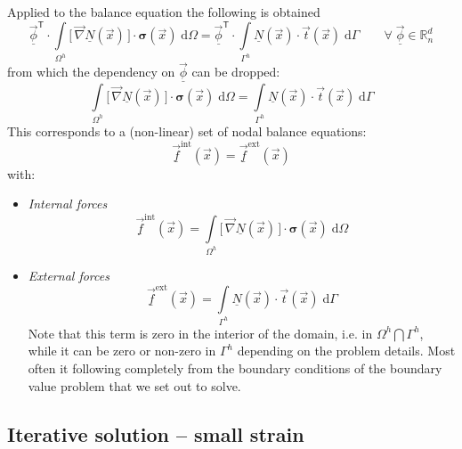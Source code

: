 \documentclass[times,namecite]{goose-article}
\begin{document}
Applied to the balance equation the following is obtained
\begin{equation}
  \underline{\vec{\phi}}^\mathsf{T} \cdot
  \int\limits_{\Omega^h}
    \big[\, \vec{\nabla} \underline{N}(\vec{x}) \,\big]
    \cdot
    \bm{\sigma}(\vec{x}) \;
  \mathrm{d}\Omega
  =
  \underline{\vec{\phi}}^\mathsf{T} \cdot
  \int\limits_{\Gamma^h}
    \underline{N}(\vec{x}) \cdot
    \vec{t}(\vec{x}) \;
  \mathrm{d}\Gamma
  \qquad
  \forall \; \underline{\vec{\phi}} \in \mathbb{R}^d_n
\end{equation}
from which the dependency on $\underline{\vec{\phi}}$ can be dropped:
\begin{equation}
  \int\limits_{\Omega^h}
    \big[\, \vec{\nabla} \underline{N}(\vec{x}) \,\big]
    \cdot
    \bm{\sigma}(\vec{x}) \;
  \mathrm{d}\Omega
  =
  \int\limits_{\Gamma^h}
    \underline{N}(\vec{x}) \cdot
    \vec{t}(\vec{x}) \;
  \mathrm{d}\Gamma
\end{equation}
This corresponds to a (non-linear) set of nodal balance equations:
\begin{equation}
  \underline{\vec{f}}^\mathrm{int}(\vec{x})
  =
  \underline{\vec{f}}^\mathrm{ext}(\vec{x})
\end{equation}
with:
\begin{itemize}
  \item \emph{Internal forces}
  \begin{equation}
    \underline{\vec{f}}^\mathrm{int}(\vec{x})
    =
    \int\limits_{\Omega^h}
      \big[\, \vec{\nabla} \underline{N}(\vec{x}) \,\big]
      \cdot
      \bm{\sigma}(\vec{x}) \;
    \mathrm{d}\Omega
  \end{equation}
  \item \emph{External forces}
  \begin{equation}
    \underline{\vec{f}}^\mathrm{ext}(\vec{x})
    =
    \int\limits_{\Gamma^h}
      \underline{N}(\vec{x}) \cdot
      \vec{t}(\vec{x}) \;
    \mathrm{d}\Gamma
  \end{equation}
  Note that this term is zero in the interior of the domain, i.e. in $\Omega^h \bigcap \Gamma^h$, while it can be zero or non-zero in $\Gamma^h$ depending on the problem details. Most often it following completely from the boundary conditions of the boundary value problem that we set out to solve.
\end{itemize}

\subsection{Iterative solution -- small strain}
\end{document}
